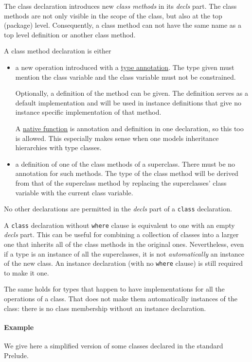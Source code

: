 The class declaration introduces new \emph{class methods} in its \emph{decls} part.
The class methods are not only visible in the scope of the class, but also at the top (package) level.
Consequently, a class method can not have the same name as a top level definition or another class method.

A class method declaration is either

\begin{itemize}
\item a new operation introduced with a \hyperref[annotation]{type annotation}. The type given must mention the class variable and the class variable must not be constrained.

Optionally, a definition of the method can be given. The definition serves as a default implementation and will be used in instance definitions that give no instance specific implementation of that method.

A \hyperref[nativefun]{native function} is annotation and definition in one declaration, so this too is allowed. This especially makes sense when one models \java{} inheritance hierarchies with type classes.

\item a definition of one of the class methods of a superclass. There must be no annotation for such methods. The type of the class method will be derived from that of the superclass method by replacing the superclasses' class variable with the current class variable.
\end{itemize}

No other declarations are permitted in the \emph{decls} part of a \texttt{class} declaration.

A \texttt{class} declaration without \texttt{where} clause is equivalent to one with an empty \emph{decls} part.
This can be useful for combining a collection of classes into a larger one that inherits all of the class methods in the original ones.
Nevertheless, even if a type is an instance of all the superclasses, it is not \emph{automatically} an instance of the new class. An instance declaration (with no \texttt{where} clause) is still required to make it one.

The same holds for types that happen to have implementations for all the operations of  a class. That does not make them automatically instances of the class: there is no class membership without an instance declaration.

\paragraph*{Example} We give here a simplified version of some classes declared in the standard Prelude.

